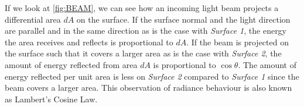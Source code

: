 If we look at \ref{fig:BEAM}, we can see how an incoming light beam projects a differential area $dA$ on the surface. If the surface normal and the light direction are parallel and in the same direction as is the case with {\it Surface 1}, the energy the area receives and reflects is proportional to $dA$. If the beam is projected on the surface such that it covers a larger area as is the case with {\it Surface 2}, the amount of energy reflected from area $dA$ is proportional to $\cos \theta$. The amount of energy reflected per unit area is less on {\it Surface 2} compared to {\it Surface 1} since the beam covers a larger area. This observation of radiance behaviour is also known as Lambert's Cosine Law. 


